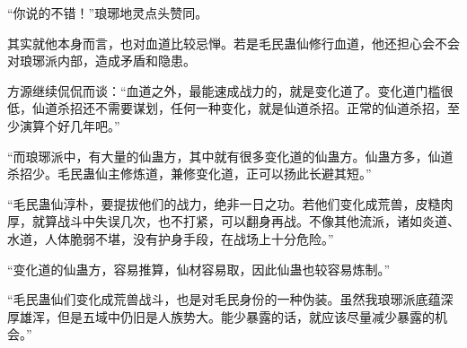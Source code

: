 \begin{this_body}
“你说的不错！”琅琊地灵点头赞同。

其实就他本身而言，也对血道比较忌惮。若是毛民蛊仙修行血道，他还担心会不会对琅琊派内部，造成矛盾和隐患。

方源继续侃侃而谈：“血道之外，最能速成战力的，就是变化道了。变化道门槛很低，仙道杀招还不需要谋划，任何一种变化，就是仙道杀招。正常的仙道杀招，至少演算个好几年吧。”

“而琅琊派中，有大量的仙蛊方，其中就有很多变化道的仙蛊方。仙蛊方多，仙道杀招少。毛民蛊仙主修炼道，兼修变化道，正可以扬此长避其短。”

“毛民蛊仙淳朴，要提拔他们的战力，绝非一日之功。若他们变化成荒兽，皮糙肉厚，就算战斗中失误几次，也不打紧，可以翻身再战。不像其他流派，诸如炎道、水道，人体脆弱不堪，没有护身手段，在战场上十分危险。”

“变化道的仙蛊方，容易推算，仙材容易取，因此仙蛊也较容易炼制。”

“毛民蛊仙们变化成荒兽战斗，也是对毛民身份的一种伪装。虽然我琅琊派底蕴深厚雄浑，但是五域中仍旧是人族势大。能少暴露的话，就应该尽量减少暴露的机会。”

\end{this_body}

